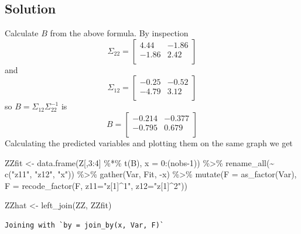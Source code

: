 \documentclass[
  letterpaper,
]{book}
\newenvironment{Shaded}{\begin{snugshade}}{\end{snugshade}}
\newcommand{\AttributeTok}[1]{\textcolor[rgb]{0.40,0.45,0.13}{#1}}
\newcommand{\DecValTok}[1]{\textcolor[rgb]{0.68,0.00,0.00}{#1}}
\newcommand{\FunctionTok}[1]{\textcolor[rgb]{0.28,0.35,0.67}{#1}}
\newcommand{\NormalTok}[1]{\textcolor[rgb]{0.00,0.23,0.31}{#1}}
\newcommand{\OtherTok}[1]{\textcolor[rgb]{0.00,0.23,0.31}{#1}}
\newcommand{\SpecialCharTok}[1]{\textcolor[rgb]{0.37,0.37,0.37}{#1}}
\newcommand{\StringTok}[1]{\textcolor[rgb]{0.13,0.47,0.30}{#1}}
\begin{document}
\hypertarget{solution}{%
\subsection{Solution}\label{solution}}

Calculate \(B\) from the above formula. By inspection \[
 \Sigma_{22} = \left[\begin{array}{r}4.44 &-1.86 \\-1.86 &2.42 \\\end{array}\right]
\] and \[
 \Sigma_{12} = \left[\begin{array}{r}-0.25 &-0.52 \\-4.79 &3.12 \\\end{array}\right]
\] so \(B = \Sigma_{12}\Sigma_{22}^{-1}\) is \[
 B = \left[\begin{array}{r}-0.214 &-0.377 \\-0.795 &0.679 \\\end{array}\right]
\] Calculating the predicted variables and plotting them on the same
graph we get

\begin{Shaded}
\begin{Highlighting}[]
\NormalTok{ZZfit }\OtherTok{\textless{}{-}} \FunctionTok{data.frame}\NormalTok{(Z[,}\DecValTok{3}\SpecialCharTok{:}\DecValTok{4}\NormalTok{] }\SpecialCharTok{\%*\%} \FunctionTok{t}\NormalTok{(B), }\AttributeTok{x =} \DecValTok{0}\SpecialCharTok{:}\NormalTok{(nobs}\DecValTok{{-}1}\NormalTok{)) }\SpecialCharTok{\%\textgreater{}\%} 
  \FunctionTok{rename\_all}\NormalTok{(}\SpecialCharTok{\textasciitilde{}} \FunctionTok{c}\NormalTok{(}\StringTok{"z11"}\NormalTok{, }\StringTok{"z12"}\NormalTok{, }\StringTok{"x"}\NormalTok{)) }\SpecialCharTok{\%\textgreater{}\%} 
  \FunctionTok{gather}\NormalTok{(Var, Fit, }\SpecialCharTok{{-}}\NormalTok{x) }\SpecialCharTok{\%\textgreater{}\%} 
  \FunctionTok{mutate}\NormalTok{(}\AttributeTok{F =} \FunctionTok{as\_factor}\NormalTok{(Var), }
         \AttributeTok{F =} \FunctionTok{recode\_factor}\NormalTok{(F, }\AttributeTok{z11=}\StringTok{"z[1]\^{}1"}\NormalTok{, }\AttributeTok{z12=}\StringTok{"z[1]\^{}2"}\NormalTok{))}

\NormalTok{ZZhat }\OtherTok{\textless{}{-}} \FunctionTok{left\_join}\NormalTok{(ZZ, ZZfit)}
\end{Highlighting}
\end{Shaded}

\begin{verbatim}
Joining with `by = join_by(x, Var, F)`
\end{verbatim}
\end{document}
